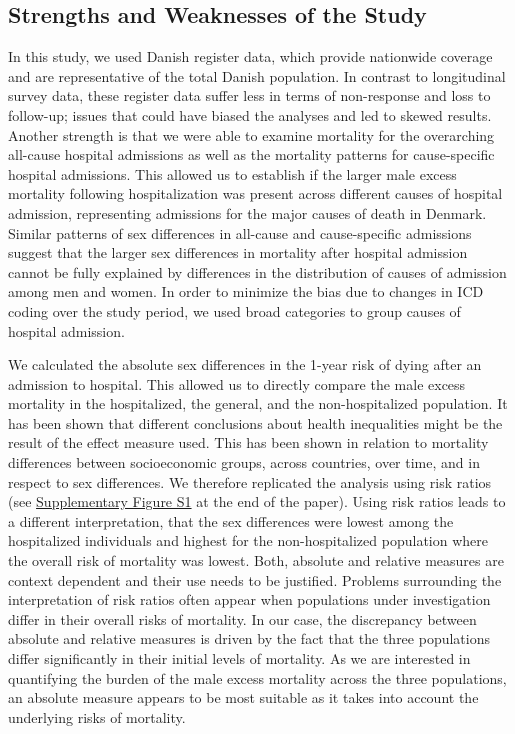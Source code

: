 \subsection{Strengths and Weaknesses of the Study}
In this study, we used Danish register data, which provide nationwide 
coverage and are representative of the total Danish population. In contrast 
to longitudinal survey data, these register data suffer less in terms of 
non-response and loss to follow-up; issues that could have biased the 
analyses and led to skewed results.\citep{oksuzyan2008} Another strength 
is that we were able to examine mortality for the overarching all-cause 
hospital admissions as well as the mortality patterns for cause-specific 
hospital admissions. This allowed us to establish if the larger male excess 
mortality following hospitalization was present across different causes 
of hospital admission, representing admissions for the major causes of 
death in Denmark. Similar patterns of sex differences in all-cause and 
cause-specific admissions suggest that the larger sex differences in 
mortality after hospital admission cannot be fully explained by differences 
in the distribution of causes of admission among men and women. In order 
to minimize the bias due to changes in ICD coding over the study period, 
we used broad categories to group causes of hospital admission.

We calculated the absolute sex differences in the 1-year risk of dying 
after an admission to hospital. This allowed us to directly compare the 
male excess mortality in the hospitalized, the general, and the non-hospitalized 
population. It has been shown that different conclusions about health 
inequalities might be the result of the effect measure used. This has 
been shown in relation to mortality differences between socioeconomic 
groups, across countries, over time,\citep{moser2007comparing} and in 
respect to sex differences.\citep{wisser2014sex,harper2005methods} We 
therefore replicated the analysis using risk ratios (see \hyperref[ch2:figS1]{Supplementary Figure S1} 
at the end of the paper). Using risk ratios leads to a different 
interpretation, that the sex differences were lowest among the hospitalized 
individuals and highest for the non-hospitalized population where the 
overall risk of mortality was lowest. Both, absolute and relative measures 
are context dependent and their use needs to be justified.\citep{moser2007comparing} 
Problems surrounding the interpretation of risk ratios often appear 
when populations under investigation differ in their overall risks 
of mortality.\citep{wisser2014sex} In our case, the discrepancy between 
absolute and relative measures is driven by the fact that the three 
populations differ significantly in their initial levels of mortality. 
As we are interested in quantifying the burden of the male excess 
mortality across the three populations, an absolute measure appears 
to be most suitable as it takes into account the underlying risks of 
mortality.\citep{tramer2005number}

